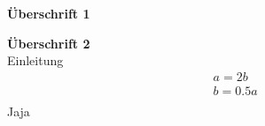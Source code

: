 \documentclass[12pt, a4paper, twoside, titlepage]{article}
\begin{document}
\begin{flushleft}
\end{flushleft}
\center
\large\textbf{ Überschrift 1 }
\normalsize
\endcenter
\begin{flushleft}
\textbf{ Überschrift 2 }\\
Einleitung
\begin{align*}
& a = 2b\\
& b = 0.5 a\\
\end{align*}
Jaja

\end{flushleft}
\end{document}

